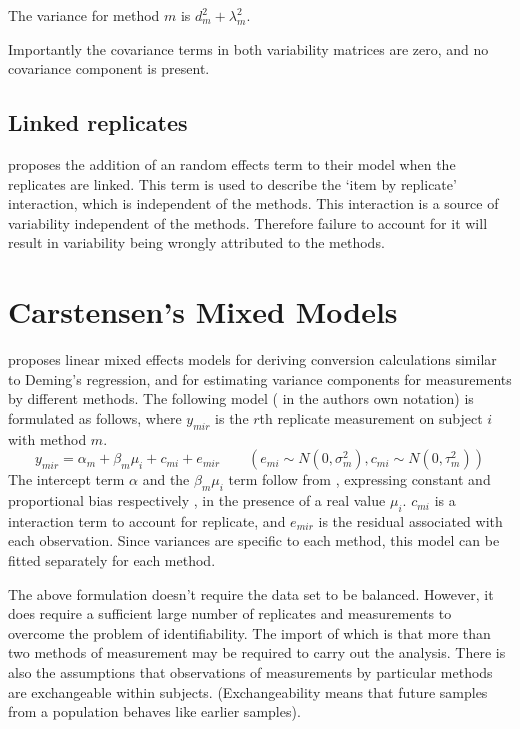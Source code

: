 \documentclass[12pt, a4paper]{report}
\theoremstyle{plain}
\theoremstyle{definition}
\theoremstyle{remark}
\begin{document}
The variance for method $m$ is $d^2_{m}+\lambda^2_{m}$.

Importantly the covariance terms in both variability matrices are zero, and no covariance component is present.


\subsection{Linked replicates}

\citet{BXC2008} proposes the addition of an random effects term to their model when the replicates are linked. This term is used to describe the `item by replicate' interaction, which is independent of the methods. This interaction is a source of variability independent of the methods. Therefore failure to account for it will result in variability being wrongly attributed to the methods.








\section{Carstensen's Mixed Models}

\citet{BXC2004} proposes linear mixed effects models for deriving
conversion calculations similar to Deming's regression, and for
estimating variance components for measurements by different
methods. The following model ( in the authors own notation) is
formulated as follows, where $y_{mir}$ is the $r$th replicate
measurement on subject $i$ with method $m$.
\begin{equation}
y_{mir}  = \alpha_{m} + \beta_{m}\mu_{i} + c_{mi} + e_{mir} \qquad
( e_{mi} \sim N(0,\sigma^{2}_{m}), c_{mi} \sim N(0,\tau^{2}_{m}))
\end{equation}
The intercept term $\alpha$ and the $\beta_{m}\mu_{i}$ term follow
from \citet{DunnSEME}, expressing constant and proportional bias
respectively , in the presence of a real value $\mu_{i}.$
$c_{mi}$ is a interaction term to account for replicate, and
$e_{mir}$ is the residual associated with each observation.
Since variances are specific to each method, this model can be
fitted separately for each method.



The above formulation doesn't require the data set to be balanced.
However, it does require a sufficient large number of replicates
and measurements to overcome the problem of identifiability. The
import of which is that more than two methods of measurement may
be required to carry out the analysis. There is also the
assumptions that observations of measurements by particular
methods are exchangeable within subjects. (Exchangeability means
that future samples from a population behaves like earlier
samples).
\end{document}
